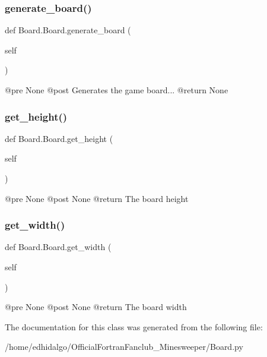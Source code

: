 \subsubsection{\texorpdfstring{generate\+\_\+board()}{generate\_board()}}
{\footnotesize\ttfamily def Board.\+Board.\+generate\+\_\+board (\begin{DoxyParamCaption}\item[{}]{self }\end{DoxyParamCaption})}

\begin{DoxyVerb}@pre    None
    @post   Generates the game board...
    @return None
\end{DoxyVerb}
 \mbox{\label{class_board_1_1_board_a6134b116a4421868d9b70a90cae3cf6a}} 
\subsubsection{\texorpdfstring{get\+\_\+height()}{get\_height()}}
{\footnotesize\ttfamily def Board.\+Board.\+get\+\_\+height (\begin{DoxyParamCaption}\item[{}]{self }\end{DoxyParamCaption})}

\begin{DoxyVerb}@pre    None
    @post   None
    @return The board height
\end{DoxyVerb}
 \mbox{\label{class_board_1_1_board_a5461757505c80b532af77cc6a651c7a7}} 
\subsubsection{\texorpdfstring{get\+\_\+width()}{get\_width()}}
{\footnotesize\ttfamily def Board.\+Board.\+get\+\_\+width (\begin{DoxyParamCaption}\item[{}]{self }\end{DoxyParamCaption})}

\begin{DoxyVerb}@pre    None
    @post   None
    @return The board width
\end{DoxyVerb}
 

The documentation for this class was generated from the following file\+:\begin{DoxyCompactItemize}
\item 
/home/edhidalgo/\+Official\+Fortran\+Fanclub\+\_\+\+Minesweeper/Board.\+py\end{DoxyCompactItemize}
